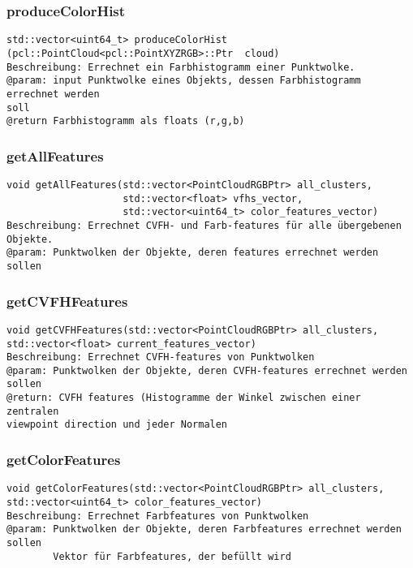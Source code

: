 \documentclass{suturo}
\begin{document}
\subsubsection{produceColorHist}
\begin{verbatim}
std::vector<uint64_t> produceColorHist
(pcl::PointCloud<pcl::PointXYZRGB>::Ptr  cloud)
Beschreibung: Errechnet ein Farbhistogramm einer Punktwolke.
@param: input Punktwolke eines Objekts, dessen Farbhistogramm errechnet werden
soll
@return Farbhistogramm als floats (r,g,b)
\end{verbatim}\label{func:produceColorHist}

\subsubsection{getAllFeatures}
\begin{verbatim}
void getAllFeatures(std::vector<PointCloudRGBPtr> all_clusters,
                    std::vector<float> vfhs_vector,
                    std::vector<uint64_t> color_features_vector)
Beschreibung: Errechnet CVFH- und Farb-features für alle übergebenen Objekte.
@param: Punktwolken der Objekte, deren features errechnet werden sollen
\end{verbatim}\label{func:getallfeatures}

\subsubsection{getCVFHFeatures}
\begin{verbatim}
void getCVFHFeatures(std::vector<PointCloudRGBPtr> all_clusters,
std::vector<float> current_features_vector)
Beschreibung: Errechnet CVFH-features von Punktwolken
@param: Punktwolken der Objekte, deren CVFH-features errechnet werden sollen
@return: CVFH features (Histogramme der Winkel zwischen einer zentralen
viewpoint direction und jeder Normalen
\end{verbatim}\label{func:getcvfhfeatures}

\subsubsection{getColorFeatures}
\begin{verbatim}
void getColorFeatures(std::vector<PointCloudRGBPtr> all_clusters,
std::vector<uint64_t> color_features_vector)
Beschreibung: Errechnet Farbfeatures von Punktwolken
@param: Punktwolken der Objekte, deren Farbfeatures errechnet werden sollen
	    Vektor für Farbfeatures, der befüllt wird
\end{verbatim}\label{func:getcolorfeatures}
\end{document}
